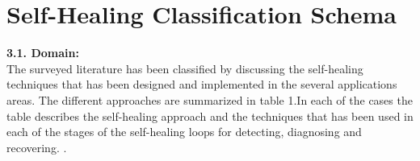 \chapter{Self-Healing Classification Schema} \label{ch:SelfHealingClassificationSchema}

\textbf{3.1. Domain:\\}
The surveyed literature has been classified by discussing the self-healing techniques that has been designed and implemented in the several applications areas. The different approaches are summarized in table 1.In each of the cases the table describes the self-healing approach and the techniques that has been used in each of the stages of the self-healing loops for detecting, diagnosing and recovering.
\cite{Harald:SelfHealingSurvey:2011}.\\

